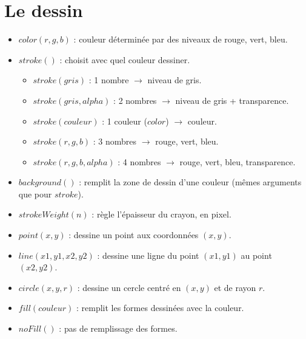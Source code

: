 \documentclass{scrartcl}
\begin{document}
	\section*{Le dessin}
		\begin{itemize}
			\item $color(r,g,b)$ : couleur déterminée par des niveaux de rouge, vert, bleu.
			\item $stroke()$ : choisit avec quel couleur dessiner.
			\begin{itemize}
				\item $stroke(gris)$ : 1 nombre $\rightarrow$ niveau de gris.
				\item $stroke(gris,alpha)$ : 2 nombres $\rightarrow$ niveau de gris + transparence.
				\item $stroke(couleur)$ : 1 couleur ($color$) $\rightarrow$ couleur.
				\item $stroke(r,g,b)$ : 3 nombres $\rightarrow$ rouge, vert, bleu.
				\item $stroke(r,g,b,alpha)$ : 4 nombres $\rightarrow$ rouge, vert, bleu, transparence.
			\end{itemize}
			\item $background()$ : remplit la zone de dessin d'une couleur (mêmes arguments que pour $stroke$).
			\item $strokeWeight(n)$ : règle l'épaisseur du crayon, en pixel.
			\item $point(x,y)$ : dessine un point aux coordonnées $(x,y)$.
			\item $line(x1,y1,x2,y2)$ : dessine une ligne du point $(x1,y1)$ au point $(x2,y2)$.
			\item $circle(x,y,r)$ : dessine un cercle centré en $(x,y)$ et de rayon $r$.
			\item $fill(couleur)$ : remplit les formes dessinées avec la couleur.
			\item $noFill()$ : pas de remplissage des formes.
		\end{itemize}
		
\end{document}
